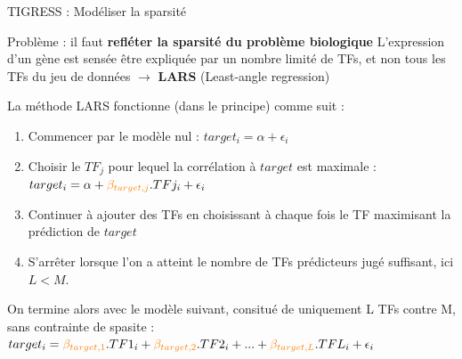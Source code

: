 \begin{frame}{TIGRESS : Modéliser la sparsité}

\begin{alertblock}{\small Problème : il faut \textbf{refléter la sparsité du problème biologique}}
\small L'expression d'un gène est sensée être expliquée par un nombre limité de TFs, et non tous les TFs du jeu de données $\rightarrow$ \textbf{LARS} (Least-angle regression)
\end{alertblock}

\scriptsize
La méthode LARS fonctionne (dans le principe) comme suit :

\begin{enumerate}\small 
    \item Commencer par le modèle nul : $target_i = \alpha + \epsilon_i$
    \item Choisir le $TF_j$ pour lequel la corrélation à $target$ est maximale : $target_i = \alpha + \textcolor{orange}{\beta_{target,j}}.TFj_i + \epsilon_i$
    \item Continuer à ajouter des TFs en choisissant à chaque fois le TF maximisant la prédiction de $target$
    \item S'arrêter lorsque l'on a atteint le nombre de TFs prédicteurs jugé suffisant, ici $L < M$.
\end{enumerate}

\scriptsize
On termine alors avec le modèle suivant, consitué de uniquement L TFs contre M, sans contrainte de spasite : 
 $target_i = \textcolor{orange}{\beta_{target,1}}.TF1_i + \textcolor{orange}{\beta_{target,2}}.TF2_i + ... + \textcolor{orange}{\beta_{target,L}}.TFL_i  + \epsilon_i$


\end{frame}
	
